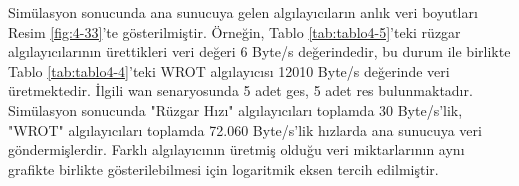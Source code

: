 Simülasyon sonucunda ana sunucuya gelen algılayıcıların anlık veri boyutları Resim \ref{fig:4-33}’te gösterilmiştir. Örneğin, Tablo \ref{tab:tablo4-5}’teki rüzgar algılayıcılarının ürettikleri veri değeri 6 Byte/s değerindedir, bu durum ile birlikte Tablo \ref{tab:tablo4-4}’teki WROT algılayıcısı 12010 Byte/s değerinde veri üretmektedir. İlgili \gls{wan} senaryosunda 5 adet \gls{ges}, 5 adet \gls{res} bulunmaktadır. Simülasyon sonucunda "Rüzgar Hızı" algılayıcıları toplamda 30 Byte/s'lik, "WROT" algılayıcıları toplamda 72.060 Byte/s'lik hızlarda ana sunucuya veri göndermişlerdir. Farklı algılayıcının üretmiş olduğu veri miktarlarının aynı grafikte birlikte gösterilebilmesi için logaritmik eksen tercih edilmiştir. 

